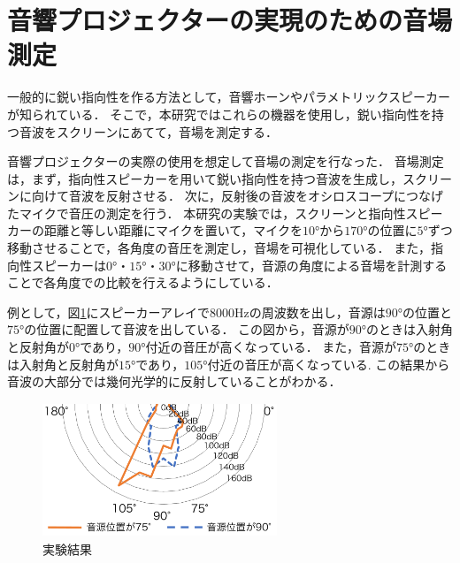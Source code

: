 \documentclass[twocolumn,10pt,a4j]{ltjsarticle}
\begin{document}
\section{音響プロジェクターの実現のための音場測定}

一般的に鋭い指向性を作る方法として，音響ホーンやパラメトリックスピーカーが知られている．
そこで，本研究ではこれらの機器を使用し，鋭い指向性を持つ音波をスクリーンにあてて，音場を測定する．

音響プロジェクターの実際の使用を想定して音場の測定を行なった．
音場測定は，まず，指向性スピーカーを用いて鋭い指向性を持つ音波を生成し，スクリーンに向けて音波を反射させる．
次に，反射後の音波をオシロスコープにつなげたマイクで音圧の測定を行う．
本研究の実験では，スクリーンと指向性スピーカーの距離と等しい距離にマイクを置いて，マイクを$\ang{10}$から$\ang{170}$の位置に$\ang{5}$ずつ移動させることで，各角度の音圧を測定し，音場を可視化している．
また，指向性スピーカーは$\ang{0}$・$\ang{15}$・$\ang{30}$に移動させて，音源の角度による音場を計測することで各角度での比較を行えるようにしている．


例として，図\ref{fig:結果}にスピーカーアレイで8000Hzの周波数を出し，音源は$\ang{90}$の位置と$\ang{75}$の位置に配置して音波を出している．
この図から，音源が$\ang{90}$のときは入射角と反射角が$\ang{0}$であり，$\ang{90}$付近の音圧が高くなっている．
また，音源が$\ang{75}$のときは入射角と反射角が$\ang{15}$であり，$\ang{105}$付近の音圧が高くなっている.
この結果から音波の大部分では幾何光学的に反射していることがわかる．




\vspace{1ex}
\begin{figure}[h]
\begin{center}
 \includegraphics[clip,width=70mm,height=40mm]{keltuka.pdf}
\end{center}
 \caption{実験結果}
 \label{fig:結果}
\end{figure}
\end{document}
